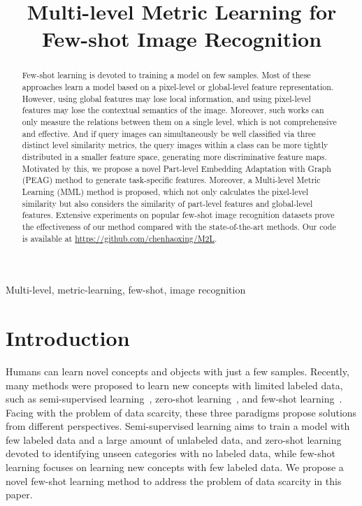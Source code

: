 \documentclass{article}
\begin{document}
\sloppy

\def\x{{\mathbf x}}
\def\L{{\cal L}}


\title{Multi-level Metric Learning for Few-shot Image Recognition}
\address{Nanjing University\\ \small\tt \{haoxingchen, yaohuili\}@smail.nju.edu.cn, \{huaxiongli, clchen\}@nju.edu.cn}


\maketitle


\begin{abstract}
Few-shot learning is devoted to training a model on few samples. Most of these approaches learn a model based on a pixel-level or global-level feature representation. However, using global features may lose local information, and using pixel-level features may lose the contextual semantics of the image. 
Moreover, such works can only measure the relations between them on a single level, which is not comprehensive and effective. And if query images can simultaneously be well classified via three distinct level similarity metrics, the query images within a class can be more tightly distributed in a smaller feature space, generating more discriminative feature maps. Motivated by this, we propose a novel Part-level Embedding Adaptation with Graph (PEAG) method to generate task-specific features. Moreover, a Multi-level Metric Learning (MML) method is proposed, which not only calculates the pixel-level similarity but also considers the similarity of part-level features and global-level features. Extensive experiments on popular few-shot image recognition datasets prove the effectiveness of our method compared with the state-of-the-art methods. Our code is available at \url{https://github.com/chenhaoxing/M2L}.
\end{abstract}
\begin{keywords}
Multi-level, metric-learning, few-shot, image recognition
\end{keywords}
\section{Introduction}
Humans can learn novel concepts and objects with just a few samples. Recently, many methods were proposed to learn new concepts with limited labeled data, such as semi-supervised learning~\cite{cvprWangKG0K20}, zero-shot learning~\cite{cvprYuJHZ20,cvprWuZZLZW20}, and few-shot learning~\cite{finn2017model,snell2017prototypical,sung2018learning,li2019revisiting,simon2020adaptive,chen2020multi}. Facing with the problem of data scarcity, these three paradigms propose solutions from different perspectives. Semi-supervised learning aims to train a model with few labeled data and a large amount of unlabeled data, and zero-shot learning devoted to identifying unseen categories with no labeled data, while few-shot learning focuses on learning new concepts with few labeled data. We propose a novel few-shot learning method to address the problem of data scarcity in this paper.
\end{document}
